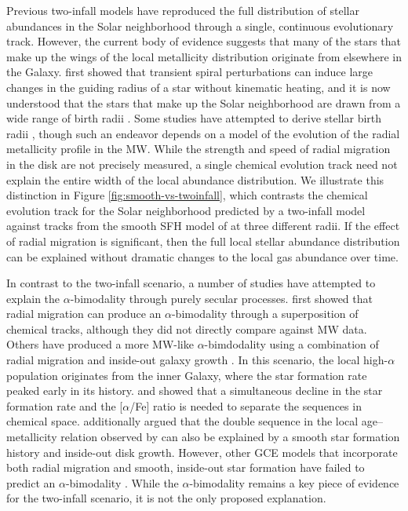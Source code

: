 \documentclass[twocolumn,twocolappendix,linenumbers]{aastex631}
\newcommand{\aFe}{[$\alpha$/Fe]\xspace}
\begin{document}
Previous two-infall models have reproduced the full distribution of stellar abundances in the Solar neighborhood through a single, continuous evolutionary track. However, the current body of evidence suggests that many of the stars that make up the wings of the local metallicity distribution originate from elsewhere in the Galaxy. \citet{sellwood_radial_2002} first showed that transient spiral perturbations can induce large changes in the guiding radius of a star without kinematic heating, and it is now understood that the stars that make up the Solar neighborhood are drawn from a wide range of birth radii \citep[e.g.,][]{schonrich_chemical_2009,frankel_measuring_2018,lehmann_probing_2024}. Some studies have attempted to derive stellar birth radii \citep[e.g.,][]{ratcliffe_unveiling_2023,lu_there_2024}, though such an endeavor depends on a model of the evolution of the radial metallicity profile in the MW. While the strength and speed of radial migration in the disk are not precisely measured, a single chemical evolution track need not explain the entire width of the local abundance distribution. We illustrate this distinction in Figure \ref{fig:smooth-vs-twoinfall}, which contrasts the chemical evolution track for the Solar neighborhood predicted by a two-infall model against tracks from the smooth SFH model of \citet{johnson_stellar_2021} at three different radii. If the effect of radial migration is significant, then the full local stellar abundance distribution can be explained without dramatic changes to the local gas abundance over time.

In contrast to the two-infall scenario, a number of studies have attempted to explain the $\alpha$-bimodality through purely secular processes. 
\citet{schonrich_chemical_2009} first showed that radial migration can produce an $\alpha$-bimodality through a superposition of chemical tracks, although they did not directly compare against MW data. Others have produced a more MW-like $\alpha$-bimdodality using a combination of radial migration and inside-out galaxy growth \citep[e.g.,][]{kubryk_evolution_2015,sharma_chemical_2021,chen_chemical_2023,prantzos_origin_2023}. In this scenario, the local high-$\alpha$ population originates from the inner Galaxy, where the star formation rate peaked early in its history. \citet{sharma_chemical_2021} and \citet{chen_chemical_2023} showed that a simultaneous decline in the star formation rate and the \aFe ratio is needed to separate the sequences in chemical space. \citet{chen_recent_2025} additionally argued that the double sequence in the local age--metallicity relation observed by \citet{nissen_high-precision_2020} can also be explained by a smooth star formation history and inside-out disk growth. However, other GCE models that incorporate both radial migration and smooth, inside-out star formation have failed to predict an $\alpha$-bimodality \citep[e.g.,][]{johnson_stellar_2021,dubay_galactic_2024}. While the $\alpha$-bimodality remains a key piece of evidence for the two-infall scenario, it is not the only proposed explanation.
\end{document}
